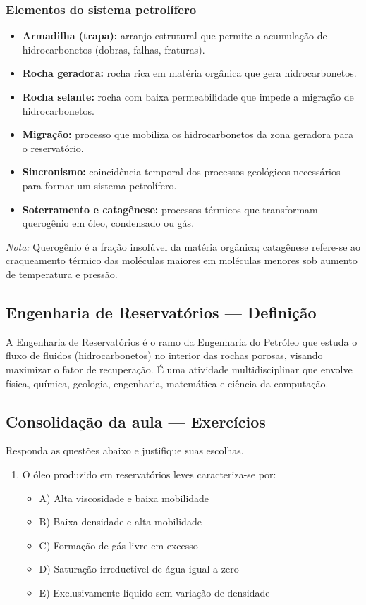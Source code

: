 \documentclass[11pt,a4paper]{article}
\begin{document}
\subsubsection{Elementos do sistema petrolífero}
\begin{itemize}
\item \textbf{Armadilha (trapa):} arranjo estrutural que permite a acumulação de hidrocarbonetos (dobras, falhas, fraturas).
\item \textbf{Rocha geradora:} rocha rica em matéria orgânica que gera hidrocarbonetos.
\item \textbf{Rocha selante:} rocha com baixa permeabilidade que impede a migração de hidrocarbonetos.
\item \textbf{Migração:} processo que mobiliza os hidrocarbonetos da zona geradora para o reservatório.
\item \textbf{Sincronismo:} coincidência temporal dos processos geológicos necessários para formar um sistema petrolífero.
\item \textbf{Soterramento e catagênese:} processos térmicos que transformam querogênio em óleo, condensado ou gás.
\end{itemize}

 \emph{Nota:} Querogênio é a fração insolúvel da matéria orgânica; catagênese refere-se ao craqueamento térmico das moléculas maiores em moléculas menores sob aumento de temperatura e pressão.

\subsection{Engenharia de Reservatórios — Definição}
 A Engenharia de Reservatórios é o ramo da Engenharia do Petróleo que estuda o fluxo de fluidos (hidrocarbonetos) no interior das rochas porosas, visando maximizar o fator de recuperação. É uma atividade multidisciplinar que envolve física, química, geologia, engenharia, matemática e ciência da computação.

\subsection{Consolidação da aula — Exercícios}
 Responda as questões abaixo e justifique suas escolhas.

\begin{enumerate}
\item O óleo produzido em reservatórios leves caracteriza-se por:
\begin{itemize}
\item A) Alta viscosidade e baixa mobilidade
\item B) Baixa densidade e alta mobilidade
\item C) Formação de gás livre em excesso
\item D) Saturação irreductível de água igual a zero
\item E) Exclusivamente líquido sem variação de densidade
\end{itemize}
\end{enumerate}
\end{document}
